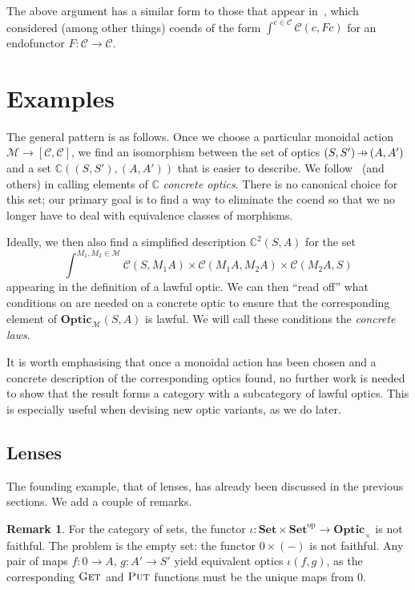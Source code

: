 \documentclass[11pt,letterpaper]{article}
\theoremstyle{plain}
\theoremstyle{definition}
\newtheorem{remark}[theorem]{Remark}
\newcommand{\C}{\mathscr{C}}
\newcommand{\M}{\mathscr{M}}
\newcommand{\Set}{\mathbf{Set}}
\newcommand{\Optic}{\mathbf{Optic}}
\newcommand{\conc}{\mathbb{C}}
\newcommand{\conctwice}{\mathbb{C}^2}
\newcommand{\op}{\mathrm{op}}
\newcommand{\fget}{\textsc{Get}}
\newcommand{\fput}{\textsc{Put}}
\newcommand{\hto}{\ensuremath{\,\mathaccent\shortmid\rightarrow\,}}
\begin{document}
The above argument has a similar form to those that appear in~\cite{OnTheTrace}, which considered (among other things) coends of the form $\int^{c \in \C} \C(c, Fc)$ for an endofunctor $F : \C \to \C$.

\section{Examples}\label{sec:examples}

The general pattern is as follows. Once we choose a particular monoidal action $\M \to [\C, \C]$, we find an isomorphism between the set of optics $(S, S') \hto (A, A')$ and a set $\conc((S, S'), (A, A'))$ that is easier to describe. We follow~\cite{ProfunctorOptics} (and others) in calling elements of $\conc$ \emph{concrete optics}. There is no canonical choice for this set; our primary goal is to find a way to eliminate the coend so that we no longer have to deal with equivalence classes of morphisms.

Ideally, we then also find a simplified description $\conctwice(S, A)$ for the set \[ \int^{M_1, M_2 \in \M} \C(S, M_1 A) \times \C(M_1 A, M_2 A) \times \C(M_2 A, S)\] appearing in the definition of a lawful optic. We can then ``read off'' what conditions on are needed on a concrete optic to ensure that the corresponding element of $\Optic_\M(S, A)$ is lawful. We will call these conditions the \emph{concrete laws}.

It is worth emphasising that once a monoidal action has been chosen and a concrete description of the corresponding optics found, no further work is needed to show that the result forms a category with a subcategory of lawful optics. This is especially useful when devising new optic variants, as we do later.

\subsection{Lenses}

The founding example, that of lenses, has already been discussed in the previous sections. We add a couple of remarks.

\begin{remark}\label{lens-iota-not-faithful}
  For the category of sets, the functor $\iota : \Set \times \Set^\op \to \Optic_\times$ is not faithful. The problem is the empty set: the functor $0 \times (-)$ is not faithful. Any pair of maps $f : 0 \to A$, $g : A' \to S'$ yield equivalent optics $\iota(f, g)$, as the corresponding $\fget$ and $\fput$ functions must be the unique maps from $0$.
\end{remark}
\end{document}
